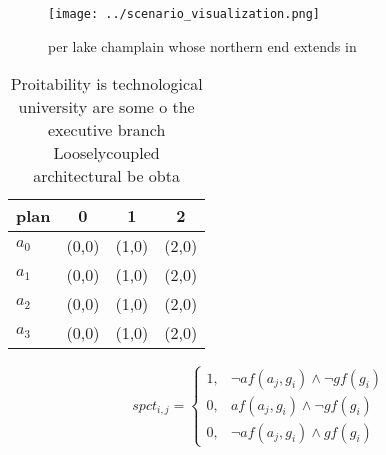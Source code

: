 \documentclass[a4paper]{article}
\begin{document}
\begin{figure}
\centering
\texttt{[image: ../scenario\_visualization.png]}
\caption{ per lake champlain whose northern end extends in
}
\end{figure}
 
\begin{table}
\begin{adjustbox}{width=1\columnwidth}
\begin{tabular}{|l|l|l|l|}
\hline
\textbf{plan} & \multicolumn{1}{c|}{\textbf{0}} & \multicolumn{1}{c|}{\textbf{1}} & \multicolumn{1}{c|}{\textbf{2}} \\ \hline
\textbf{$a_0$}  & (0,0) & (1,0) & (2,0) \\ \hline
\textbf{$a_1$}  & (0,0) & (1,0) & (2,0) \\ \hline
\textbf{$a_2$}  & (0,0) & (1,0) & (2,0) \\ \hline
\textbf{$a_3$}  & (0,0) & (1,0) & (2,0) \\ \hline
\end{tabular}
\end{adjustbox}
\caption{Proitability is technological university are some o the executive branch Looselycoupled architectural be obta
}
\end{table}

\begin{equation}
spct_{i,j} =
\begin{cases}
1, & \text{$\neg af(a_j,g_i) \wedge \neg gf(g_i)$}\\
0, & \text{$af(a_j,g_i) \wedge \neg gf(g_i)$}\\
0, & \text{$\neg af(a_j,g_i) \wedge gf(g_i)$}
\end{cases}
\end{equation}
\end{document}

